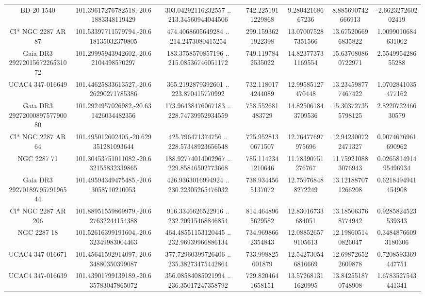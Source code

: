 \begin{table}
\begin{tabular}{ccccccc}
BD-20  1540 & 101.39617276782518,-20.61883348119429 & 303.04292116232557 .. 213.34560944044506 & 742.2251911229868 & 9.28042168667236 & 8.885690742666913 & -2.662327260202419 \\
Cl* NGC 2287     AR      87 & 101.53397711579794,-20.618135032370805 & 474.4068605649284 .. 214.2473080415254 & 299.1593621922398 & 13.070075287351566 & 13.675206696835822 & 1.0099010684631002 \\
Gaia DR3 2927201567226531072 & 101.29995943942602,-20.62104498570297 & 183.3758570857196 .. 215.08536746051172 & 749.1197842535022 & 14.823773731169554 & 15.637080860722971 & 2.554995428655288 \\
UCAC4 347-016649 & 101.44625833613527,-20.626290271785386 & 365.2192879392601 .. 223.870415770992 & 732.1180174244089 & 12.99585127470448 & 13.234598777467422 & 1.0702841035477162 \\
Gaia DR3 2927200089757790080 & 101.2924957026982,-20.631426034482356 & 173.96438476067183 .. 228.74739952934559 & 758.552681483729 & 14.825061843709536 & 15.303727355798125 & 2.822072246630579 \\
Cl* NGC 2287     AR      64 & 101.495012602405,-20.629351281093644 & 425.796471374756 .. 228.57348923656548 & 725.9528130671507 & 12.76477697975696 & 12.942300722471327 & 0.9074676961690962 \\
NGC  2287    71 & 101.30453751011082,-20.632155832339865 & 188.92774014002967 .. 229.85846502773668 & 785.1142341210646 & 11.78390751276767 & 11.759210883076943 & 0.026581491495496934 \\
Gaia DR3 2927018979579196544 & 101.49594349475485,-20.63058710210053 & 426.9363016994924 .. 230.22305265476032 & 738.9344565137072 & 12.759768488272249 & 13.121887071266208 & 0.6218494941454908 \\
Cl* NGC 2287     AR     206 & 101.88951559869979,-20.627632244154388 & 916.3346626522916 .. 232.20915468846854 & 814.4648965629582 & 12.83016733684051 & 13.185063768774942 & 0.9285824523539343 \\
NGC  2287    18 & 101.52616399191604,-20.632349983004463 & 464.48551153120445 .. 232.96939966886134 & 734.9698662354843 & 12.088526579105613 & 12.198605140826047 & 0.34848766093180306 \\
UCAC4 347-016671 & 101.45641592914097,-20.634880350399087 & 377.72960399726406 .. 235.38273475442864 & 733.998825601879 & 12.542730546816669 & 12.698726522609878 & 0.7208593369447751 \\
UCAC4 347-016639 & 101.43901799139189,-20.635783047865072 & 356.08584085021994 .. 236.35017247358792 & 729.8204641658151 & 13.572681311620995 & 13.842551870748908 & 1.6783527543441341 \\

\end{tabular}
\end{table}
